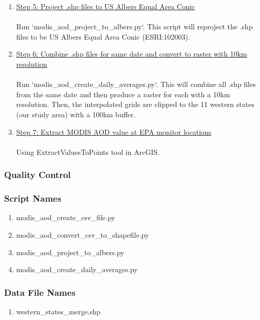 \begin{enumerate}
\item \underline{Step 5: Project .shp files to US Albers Equal Area Conic}\\\\
Run `modis\_aod\_project\_to\_albers.py`. This script will reproject the .shp files to be US Albers Equal Area Conic (ESRI:102003).

\item \underline{Step 6: Combine .shp files for same date and convert to raster with 10km resolution}\\\\
Run `modis\_aod\_create\_daily\_averages.py`. This will combine all .shp files from the same date and then produce a raster for each with a 10km resolution. Then, the interpolated grids are clipped to the 11 western states (our study area) with a 100km buffer.

\item \underline{Step 7: Extract MODIS AOD value at EPA monitor locations}\\\\
Using ExtractValuesToPoints tool in ArcGIS.

\end{enumerate}

\subsubsection*{Quality Control}

\subsubsection*{Script Names}

\begin{enumerate}
\item modis\_aod\_create\_csv\_file.py
\item modis\_aod\_convert\_csv\_to\_shapefile.py
\item modis\_aod\_project\_to\_albers.py
\item modis\_aod\_create\_daily\_averages.py
\end{enumerate}

\subsubsection*{Data File Names}

\begin{enumerate}
\item western\_states\_merge.shp
\end{enumerate}